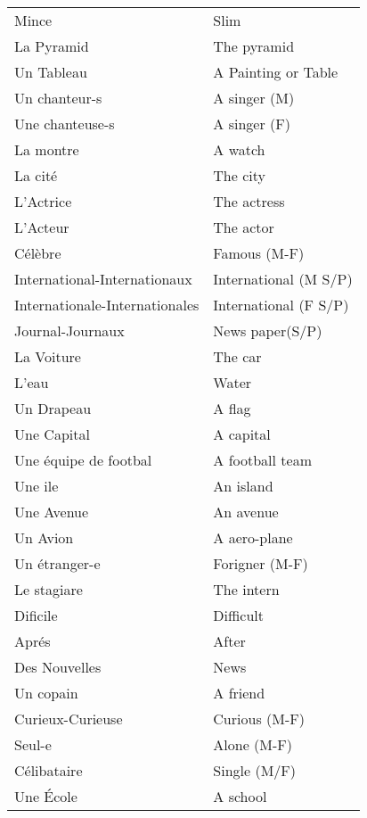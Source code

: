 \begin{longtable}{l  l}
Mince		& Slim		\\
La Pyramid	& The pyramid	\\
Un Tableau	& A Painting or Table	\\
Un chanteur-s	& A singer (M)	\\
Une chanteuse-s	& A singer (F)	\\
La montre	& A watch	\\
La cit\'e	& The city	\\
L'Actrice	& The actress	\\
L'Acteur	& The actor	\\
C\'el\`ebre	& Famous (M-F)	\\
International-Internationaux	& International (M S/P)\\
Internationale-Internationales	& International (F S/P)\\
Journal-Journaux & News paper(S/P)\\ 
La Voiture	& The car	\\
L'eau		& Water		\\ 
Un Drapeau	& A flag	\\
Une Capital	& A capital	\\
Une \'equipe de footbal	& A football team\\
Une ile		& An island	\\
Une Avenue	& An avenue	\\
Un Avion	& A aero-plane	\\
Un \'etranger-e	& Forigner (M-F)\\
Le stagiare	& The intern	\\
Dificile	& Difficult	\\
Apr\'es		& After		\\
Des Nouvelles	& News		\\
Un copain	& A friend	\\
Curieux-Curieuse& Curious (M-F)	\\
Seul-e		& Alone (M-F)	\\
C\'elibataire	& Single (M/F)	\\
Une \'Ecole	& A school	\\
\end{longtable}
